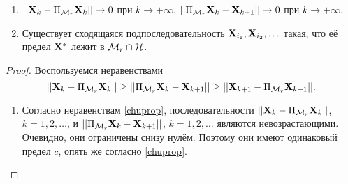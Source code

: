 \documentclass[12pt,a4paper,fleqn,leqno]{article}
\begin{document}
\begin{theorem}
\label{th:converg}
\begin{enumerate}
Пусть пространство $\calM_r$ является замкнутым в топологии, порождаемой нормой $\|\cdot\|$. Тогда
\item $||\mathbf{X}_k - \Pi_{\mathcal{M}_r}\mathbf{X}_k|| \to 0$ при $k \to +\infty$, $||\Pi_{\mathcal{M}_r}\mathbf{X}_k - \mathbf{X}_{k+1}|| \to 0$ при $k \to +\infty$.
\item Существует сходящаяся подпоследовательность $\mathbf{X}_{i_1}, \mathbf{X}_{i_2}, \ldots$ такая, что её предел $\mathbf{X}^*$ лежит в $\mathcal{M}_r \cap \mathcal{H}$.
\end{enumerate}
\end{theorem}
\begin{proof}
Воспользуемся неравенствами \cite{Chu.etal2003}
\begin{equation}
\label{chuprop}
||\mathbf{X}_k - \Pi_{\mathcal{M}_r} \mathbf{X}_k|| \ge ||\Pi_{\mathcal{M}_r} \mathbf{X}_k - \mathbf{X}_{k + 1}|| \ge ||\mathbf{X}_{k+1} - \Pi_{\mathcal{M}_r} \mathbf{X}_{k + 1}||.
\end{equation}

\begin{enumerate}
\item Согласно неравенствам \eqref{chuprop}, последовательности $||\mathbf{X}_k - \Pi_{\mathcal{M}_r} \mathbf{X}_k||$, $k = 1, 2, \ldots$, и $||\Pi_{\mathcal{M}_r} \mathbf{X}_k - \mathbf{X}_{k + 1}||$, $k = 1, 2, \ldots$ являются невозрастающими. Очевидно, они ограничены снизу нулём. Поэтому они имеют одинаковый предел $c$, опять же согласно \eqref{chuprop}.


\end{enumerate}
\end{proof}
\end{document}
